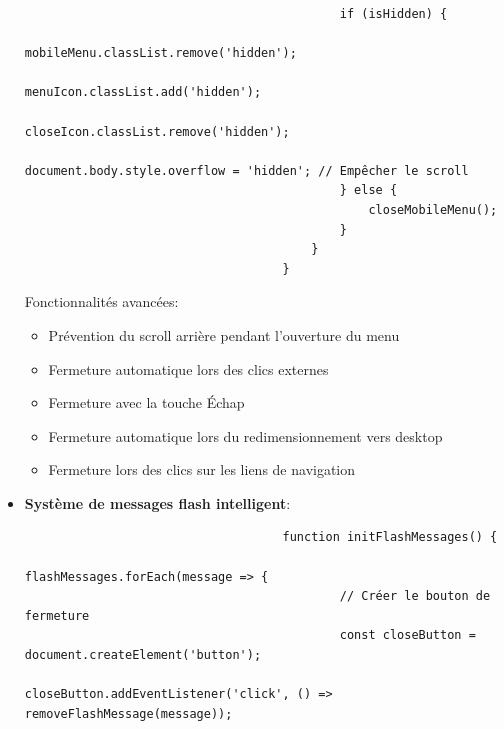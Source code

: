 \documentclass[a4paper,11pt]{article}
\begin{document}
\begin{itemize}
\begin{tcolorbox}[colback=lightgray!5, colframe=gray!80, left=-70mm, right=5mm, top=2mm, bottom=0mm, boxrule=0.1mm]
\begin{verbatim}
                                            if (isHidden) {
                                                mobileMenu.classList.remove('hidden');
                                                menuIcon.classList.add('hidden');
                                                closeIcon.classList.remove('hidden');
                                                document.body.style.overflow = 'hidden'; // Empêcher le scroll
                                            } else {
                                                closeMobileMenu();
                                            }
                                        }
                                    }
                                \end{verbatim}
                            \end{tcolorbox}

                            \noindent Fonctionnalités avancées:
                            \begin{itemize}
                                \item Prévention du scroll arrière pendant l'ouverture du menu
                                \item Fermeture automatique lors des clics externes
                                \item Fermeture avec la touche Échap
                                \item Fermeture automatique lors du redimensionnement vers desktop
                                \item Fermeture lors des clics sur les liens de navigation
                            \end{itemize}

                        \item \textbf{Système de messages flash intelligent}:
                            \begin{tcolorbox}[colback=lightgray!5, colframe=gray!80, left=-70mm, right=5mm, top=2mm, bottom=0mm, boxrule=0.1mm]
                                \begin{verbatim}
                                    function initFlashMessages() {
                                        flashMessages.forEach(message => {
                                            // Créer le bouton de fermeture
                                            const closeButton = document.createElement('button');
                                            closeButton.addEventListener('click', () => removeFlashMessage(message));
                                            

\end{verbatim}
\end{tcolorbox}
\end{itemize}
\end{document}
